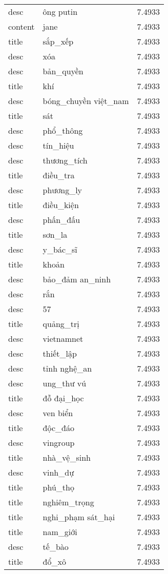 \documentclass{article}
\begin{document}
\begin{tabular}{lll}
desc & ông putin & 7.4933\\
content & jane & 7.4933\\
title & sắp\_xếp & 7.4933\\
desc & xóa & 7.4933\\
desc & bản\_quyền & 7.4933\\
title & khí & 7.4933\\
desc & bóng\_chuyền việt\_nam & 7.4933\\
title & sát & 7.4933\\
desc & phổ\_thông & 7.4933\\
desc & tín\_hiệu & 7.4933\\
desc & thương\_tích & 7.4933\\
title & điều\_tra & 7.4933\\
desc & phương\_ly & 7.4933\\
title & điều\_kiện & 7.4933\\
desc & phấn\_đấu & 7.4933\\
title & sơn\_la & 7.4933\\
desc & y\_bác\_sĩ & 7.4933\\
title & khoản & 7.4933\\
desc & bảo\_đảm an\_ninh & 7.4933\\
desc & rắn & 7.4933\\
desc & 57 & 7.4933\\
title & quảng\_trị & 7.4933\\
desc & vietnamnet & 7.4933\\
desc & thiết\_lập & 7.4933\\
desc & tỉnh nghệ\_an & 7.4933\\
desc & ung\_thư vú & 7.4933\\
title & đỗ đại\_học & 7.4933\\
desc & ven biển & 7.4933\\
title & độc\_đáo & 7.4933\\
desc & vingroup & 7.4933\\
title & nhà\_vệ\_sinh & 7.4933\\
desc & vinh\_dự & 7.4933\\
title & phú\_thọ & 7.4933\\
title & nghiêm\_trọng & 7.4933\\
title & nghi\_phạm sát\_hại & 7.4933\\
title & nam\_giới & 7.4933\\
desc & tế\_bào & 7.4933\\
title & đổ\_xô & 7.4933\\

\end{tabular}
\end{document}
